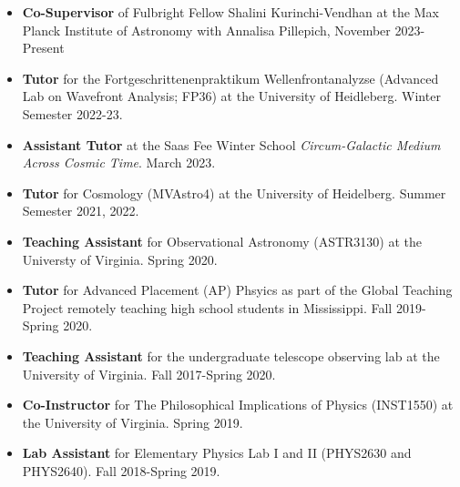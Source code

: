 \documentclass[a4paper,10pt,oneside]{article}
\begin{document}
\noindent{}

\begin{itemize}[wide, labelwidth=!, labelindent=-11pt, parsep=0pt]
    \item {\bf Co-Supervisor} of Fulbright Fellow Shalini Kurinchi-Vendhan at the Max Planck Institute of Astronomy with Annalisa Pillepich, November 2023-Present
    \item {\bf Tutor} for the Fortgeschrittenenpraktikum Wellenfrontanalyzse (Advanced Lab on Wavefront Analysis; FP36) at the University of Heidleberg. Winter Semester 2022-23.
    \item {\bf Assistant Tutor} at the Saas Fee Winter School {\it Circum-Galactic Medium Across Cosmic Time}. March 2023. 
    \item {\bf Tutor} for Cosmology (MVAstro4) at the University of Heidelberg. Summer Semester 2021, 2022.
    \item {\bf Teaching Assistant} for Observational Astronomy (ASTR3130) at the Universty of Virginia. Spring 2020.
    \item {\bf Tutor} for Advanced Placement (AP) Phsyics as part of the Global Teaching Project remotely teaching high school students in Mississippi. Fall 2019-Spring 2020.
    \item {\bf Teaching Assistant} for the undergraduate telescope observing lab at the University of Virginia. Fall 2017-Spring 2020. 
    \item {\bf Co-Instructor} for The Philosophical Implications of Physics (INST1550) at the University of Virginia. Spring 2019.
    \item {\bf Lab Assistant} for Elementary Physics Lab I and II (PHYS2630 and PHYS2640). Fall 2018-Spring 2019. 
\end{itemize}

\noindent{}
\end{document}
